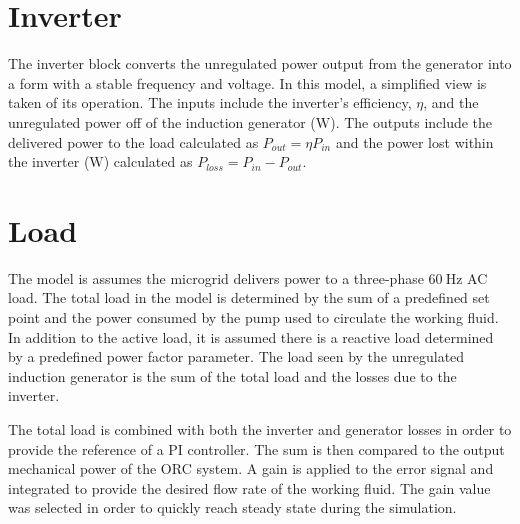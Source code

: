 \section{Inverter}
The inverter block converts the unregulated power output from the generator into a form with a stable frequency and voltage. In this model, a simplified view is taken of its operation. The inputs include the inverter's efficiency, $\eta$, and the unregulated power off of the induction generator ($\si{\watt}$). The outputs include the delivered power to the load calculated as $P_{out} = \eta P_{in}$  and the power lost within the inverter ($\si{\watt}$) calculated as $P_{loss} = P_{in} - P_{out}$. 

\section{Load}
The model is assumes the microgrid delivers power to a three-phase $\SI{60}{\hertz}$ AC load. The total load in the model is determined by the sum of a predefined set point and the power consumed by the pump used to circulate the working fluid. In addition to the active load, it is assumed there is a reactive load determined by a predefined power factor parameter. 
The load seen by the unregulated induction generator is the sum of the total load and the losses due to the inverter. 

The total load is combined with both the inverter and generator losses in order to provide the reference of a PI controller. The sum is then compared to the output mechanical power of the ORC system. A gain is applied to the error signal and integrated to provide the desired flow rate of the working fluid. The gain value was selected in order to quickly reach steady state during the simulation.

